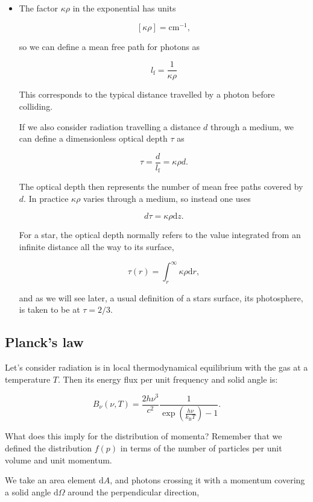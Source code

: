 \documentclass[twocolumn]{article}
\begin{document}
\begin{itemize}
\item
  The factor \(\kappa\rho\) in the exponential has units

  \[[\kappa\rho]=\mathrm{cm}^{-1},\]

  so we can define a mean free path for photons as

  \[\displaystyle l_\mathrm{f}=\frac{1}{\kappa\rho}\]

  This corresponds to the typical distance travelled by a photon before
  colliding.

  If we also consider radiation travelling a distance \(d\) through a
  medium, we can define a dimensionless optical depth \(\tau\) as

  \[\tau = \frac{d}{l_\mathrm{f}}=\kappa\rho d.\]

  The optical depth then represents the number of mean free paths
  covered by \(d\). In practice \(\kappa\rho\) varies through a medium,
  so instead one uses

  \[d\tau = \kappa\rho \mathrm{d}z.\]

  For a star, the optical depth normally refers to the value integrated
  from an infinite distance all the way to its surface,

  \[\tau(r) = \int_r^\infty \kappa\rho \mathrm{d}r,\]

  and as we will see later, a usual definition of a stars surface, its
  photosphere, is taken to be at \(\tau=2/3\).
\end{itemize}

\hypertarget{plancks-law}{%
\subsection{Planck's law}\label{plancks-law}}

Let's consider radiation is in local thermodynamical equilibrium with
the gas at a temperature \(T\). Then its energy flux per unit frequency
and solid angle is:

\[B_\nu (\nu,T)=\frac{2h\nu^3}{c^2}\frac{1}{\displaystyle \exp\left(\frac{h\nu}{k_\mathrm{B}T}\right)-1}.\]

What does this imply for the distribution of momenta? Remember that we
defined the distribution \(f(p)\) in terms of the number of particles
per unit volume and unit momentum.

We take an area element \(\mathrm{d}A\), and photons crossing it with a
momentum covering a solid angle \(\mathrm{d}\Omega\) around the
perpendicular direction,
\end{document}
